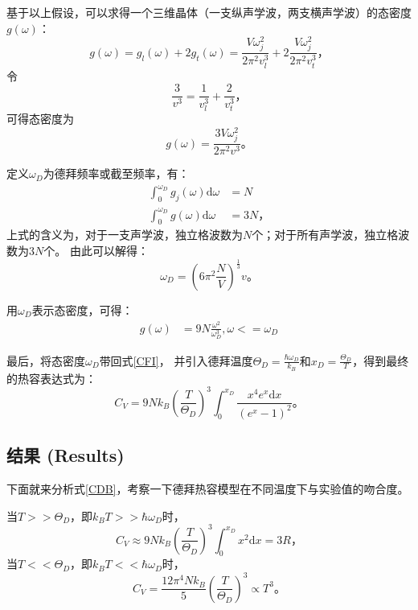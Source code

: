 \documentclass[declarePage]{ecnuthesis}
\begin{document}
基于以上假设，可以求得一个三维晶体（一支纵声学波，两支横声学波）的态密度$g(\omega)$：
\begin{equation}
    g(\omega) = g_l(\omega) + 2g_t(\omega) = \frac{V\omega_j^2}{2\pi^2v_l^3} + 2\frac{V\omega_j^2}{2\pi^2v_t^3} \text{，}
\end{equation}
令
\begin{equation}
    \frac{3}{v^3} = \frac{1}{v_l^3} + \frac{2}{v_t^3} \text{，}
\end{equation}
可得态密度为
\begin{equation}
    g(\omega) = \frac{3V\omega_j^2}{2\pi^2v^3} \text{。}
\end{equation}

定义$\omega_D$为德拜频率或截至频率，有：
\begin{align}
    \int_{0}^{\omega_D}g_j(\omega)\mathrm{d}\omega &= N\\
    \int_{0}^{\omega_D}  g(\omega)\mathrm{d}\omega &= 3N \text{，}
\end{align}
上式的含义为，对于一支声学波，独立格波数为$N$个；对于所有声学波，独立格波数为$3N$个。%
由此可以解得：
\begin{equation}
    \omega_D = \left( 6\pi^2\frac{N}{V} \right)^\frac{1}{3}v \text{。}
\end{equation}

用$\omega_D$表示态密度，可得：
\begin{align}
    g(\omega) &= 9N\frac{\omega^2}{\omega_D^3} \mathrm{,}\omega<=\omega_D
\end{align}

最后，将态密度$\omega_D$带回式\ref{CFI}，%
并引入德拜温度$\Theta_D=\frac{\hbar\omega_D}{k_B}$和$x_D=\frac{\Theta_D}{T}$，得到最终的热容表达式为：
\begin{equation}
    C_V = 9Nk_B\left( \frac{T}{\Theta_D} \right)^3 \int_{0}^{x_D}\frac{x^4 e^x \mathrm{d}x}{(e^x-1)^2} \text{。} \label{CDB}
\end{equation}

\subsection{结果 (Results)}

下面就来分析式\ref{CDB}，考察一下德拜热容模型在不同温度下与实验值的吻合度。

当$T>>\Theta _D$，即$k_B T>>\hbar \omega_D$时，
\begin{equation}
    C_V \approx 9Nk_B\left( \frac{T}{\Theta_D} \right)^3 \int_{0}^{x_D}x^2 \mathrm{d}x = 3R \text{，}
\end{equation}
当$T<<\Theta _D$，即$k_B T<<\hbar \omega_D$时，
\begin{equation}
    C_V = \frac{12\pi^4Nk_B}{5}\left( \frac{T}{\Theta _D} \right)^3 \propto T^3 \text{。}
\end{equation}
\end{document}
